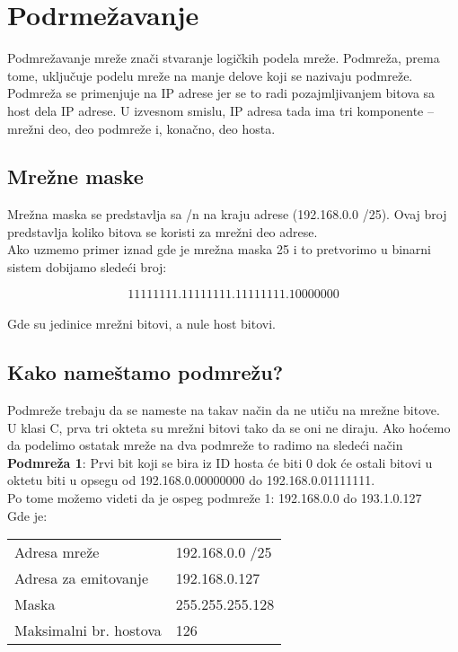 \section{Podrmežavanje}
Podmrežavanje mreže znači stvaranje logičkih podela mreže. Podmreža, prema tome, uključuje podelu mreže na manje delove koji se nazivaju podmreže. Podmreža se primenjuje na IP adrese jer se to radi pozajmljivanjem bitova sa host dela IP adrese. U izvesnom smislu, IP adresa tada ima tri komponente – mrežni deo, deo podmreže i, konačno, deo hosta.

\subsection{Mrežne maske}
Mrežna maska se predstavlja sa /n na kraju adrese (192.168.0.0 /25). Ovaj broj predstavlja koliko bitova se koristi za mrežni deo adrese.\\

Ako uzmemo primer iznad gde je mrežna maska 25 i to pretvorimo u binarni sistem dobijamo slede\'{c}i broj:

$$11111111.11111111.11111111.10000000$$\\

Gde su jedinice mrežni bitovi, a nule host bitovi.\\

\subsection{Kako nameštamo podmrežu?}
Podmreže trebaju da se nameste na takav način da ne utiču na mrežne bitove.\\

U klasi C, prva tri okteta su mrežni bitovi tako da se oni ne diraju. Ako ho\'{c}emo da podelimo ostatak mreže na dva podmreže to radimo na slede\'{c}i način\\

\textbf{Podmreža 1}: Prvi bit koji se bira iz ID hosta \'{c}e biti 0 dok \'{c}e ostali bitovi u oktetu biti u opsegu od 192.168.0.00000000 do 192.168.0.01111111.\\

Po tome možemo videti da je ospeg podmreže 1: 192.168.0.0 do 193.1.0.127\\
Gde je:
\begin{table}[H]
\begin{center}
\begin{tabular}{ll}
Adresa mreže           & 192.168.0.0 /25 \\
Adresa za emitovanje   & 192.168.0.127   \\
Maska                  & 255.255.255.128 \\
Maksimalni br. hostova & 126             \\             
\end{tabular}
\end{center}
\end{table}

